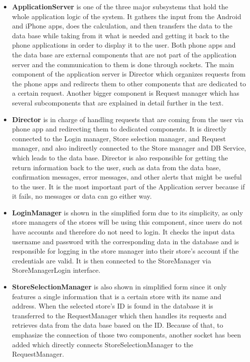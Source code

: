 \newpage

\begin{itemize}
\item \textbf{ApplicationServer} is one of the three major subsystems that hold the whole application logic of the system. It gathers the input from the Android and iPhone apps, does the calculation, and then transfers the data to the data base while taking from it what is needed and getting it back to the phone applications in order to display it to the user. Both phone apps and the data base are external components that are not part of the application server and the communication to them is done through sockets. The main component of the application server is Director which organizes requests from the phone apps and redirects them to other components that are dedicated to a certain request. Another bigger component is Request manager which has several subcomponents that are explained in detail further in the text.  

\item \textbf{Director} is in charge of handling requests that are coming from the user via phone app and redirecting them to dedicated components. It is directly connected to the Login manager, Store selection manager, and Request manager, and also indirectly connected to the Store manager and DB Service, which leads to the data base. Director is also responsible for getting the return information back to the user, such as data from the data base, confirmation messages, error messages, and other alerts that might be useful to the user. It is the most important part of the Application server because if it fails, no messages or data can go either way.  

\item \textbf{LoginManager} is shown in the simplified form due to its simplicity, as only store managers of the stores will be using this component, since users do not have accounts and therefore do not need to login. It checks the input data username and password with the corresponding data in the database and is responsible for logging in the store manager into their store's account if the credentials are valid. It is then connected to the StoreManager via StoreManagerLogin interface. 

\item \textbf{StoreSelectionManager} is also shown in simplified form since it only features a single information that is a certain store with its name and address. When the selected store's ID is found in the database it is transferred to the RequestManager which then handles its requests and retrieves data from the data base based on the ID. Because of that, to emphasize the connection of those two components, another socket has been added which directly connects StoreSelectionManager to the RequestManager.  


\end{itemize}
